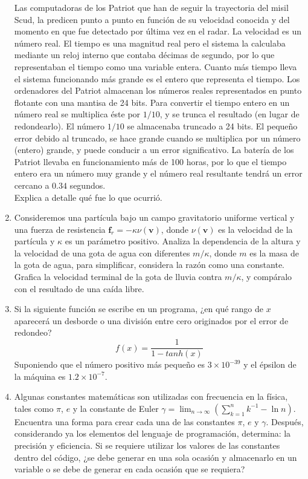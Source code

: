 \documentclass[11pt]{article}
\begin{document}
\begin{enumerate}
Las computadoras de los Patriot que han de seguir la trayectoria del misil Scud, la predicen punto a punto en funci\'{o}n de su velocidad conocida y del momento en que fue detectado por última vez en el radar. La velocidad es un número real. El tiempo es una magnitud real pero el sistema la calculaba mediante un reloj interno que contaba d\'{e}cimas de segundo, por lo que representaban el tiempo como una variable entera. Cuanto m\'{a}s tiempo lleva el sistema funcionando m\'{a}s grande es el entero que representa el tiempo. Los ordenadores del Patriot almacenan los números reales representados en punto flotante con una mantisa de 24 bits. Para convertir el tiempo entero en un número real se multiplica \'{e}ste por $1/10$, y se trunca el resultado (en lugar de redondearlo). El número $1/10$ se almacenaba truncado a 24 bits. El pequeño error debido al truncado, se hace grande cuando se multiplica por un número (entero) grande, y puede conducir a un error significativo. La bater\'{i}a de los Patriot llevaba en funcionamiento m\'{a}s de 100 horas, por lo que el tiempo entero era un número muy grande y el número real resultante tendr\'{a} un error cercano a $0.34$ segundos.
\\Explica a detalle qu\'{e} fue lo que ocurri\'{o}.
\item Consideremos una part\'{i}cula bajo un campo gravitatorio uniforme vertical y una fuerza de resistencia $\mathbf{f}_{r} = - \kappa \nu(\mathbf{v})$, donde $\nu(\mathbf{v})$ es la velocidad de la part\'{i}cula y $\kappa$ es un par\'{a}metro positivo. Analiza la dependencia de la altura y la velocidad de una gota de agua con diferentes $m/\kappa$, donde $m$ es la masa de la gota de agua, para simplificar, considera la raz\'{o}n como una constante. Grafica la velocidad terminal de la gota de lluvia contra $m/\kappa$, y comp\'{a}ralo con el resultado de una ca\'{i}da libre.
\item Si la siguiente funci\'{o}n se escribe en un programa, ¿en qu\'{e} rango de $x$ aparecer\'{a} un desborde o una divisi\'{o}n entre cero originados por el error de redondeo?
\[ f(x)=\dfrac{1}{1-tanh(x)} \]
Suponiendo que el número positivo m\'{a}s pequeño es $3 \times 10^{-39}$  y el \'{e}psilon de la m\'{a}quina es $1.2 \times 10^{-7}$.
\item Algunas constantes matem\'{a}ticas son utilizadas con frecuencia en la f\'{i}sica, tales como $\pi$, $e$ y la constante de Euler $\gamma = \lim_{n\rightarrow \infty} (\sum_{k=1}^{n} k^{-1} - \ln n)$. Encuentra una forma para crear cada una de las constantes $\pi$, $e$ y $\gamma$. Despu\'{e}s, considerando ya los elementos del lenguaje de programaci\'{o}n, determina: la precisi\'{o}n y eficiencia. Si se requiere utilizar los valores de las constantes dentro del c\'{o}digo, ¿se debe generar en una sola ocasi\'{o}n y almacenarlo en un variable o se debe de generar en cada ocasi\'{o}n que se requiera?
\end{enumerate}
\end{document}
